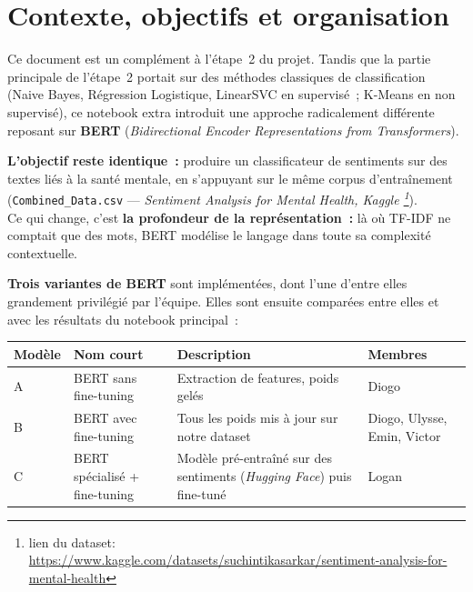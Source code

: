 \documentclass[12pt,a4paper]{article}
\begin{document}
\tableofcontents
\newpage

\section{Contexte, objectifs et organisation}

Ce document est un complément à l'étape~2 du projet. Tandis que la partie principale de
l'étape~2 portait sur des méthodes classiques de classification (Naive Bayes, Régression
Logistique, LinearSVC en supervisé~; K-Means en non supervisé), ce notebook extra
introduit une approche radicalement différente reposant sur \textbf{BERT} (\textit{Bidirectional
Encoder Representations from Transformers}).

\textbf{L'objectif reste identique~:} produire un classificateur de sentiments sur des textes liés à la
santé mentale, en s'appuyant sur le même corpus d'entraînement
(\texttt{Combined\_Data.csv} — \textit{Sentiment Analysis for Mental Health, Kaggle \footnote{lien du dataset: \href{https://www.kaggle.com/datasets/suchintikasarkar/sentiment-analysis-for-mental-health}{https://www.kaggle.com/datasets/suchintikasarkar/sentiment-analysis-for-mental-health}}}).\\
Ce qui change, c'est \textbf{la profondeur de la représentation~:} là où TF-IDF ne comptait que des
mots, BERT modélise le langage dans toute sa complexité contextuelle.

\textbf{Trois variantes de BERT} sont implémentées, dont l'une d'entre elles grandement privilégié par l'équipe. 
Elles sont ensuite comparées entre elles et avec les résultats du notebook principal~:

\begin{center}
\begin{tabular}{@{}llL{4cm}L{3cm}@{}}
  \toprule
  Modèle & Nom court & Description & Membres \\
  \midrule
  A & BERT sans fine-tuning & Extraction de features, poids gelés & Diogo \\
  B & BERT avec fine-tuning & Tous les poids mis à jour sur notre dataset & Diogo, Ulysse, Emin, Victor \\
  C & BERT spécialisé + fine-tuning & Modèle pré-entraîné sur des sentiments (\textit{Hugging Face}) puis fine-tuné & Logan \\
  \bottomrule
\end{tabular}
\end{center}
\end{document}
